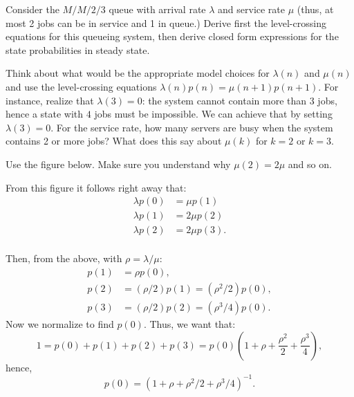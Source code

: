 \begin{exercise}[\faFlask]
Consider the $M/M/2/3$ queue with arrival rate $\lambda$ and
service rate $\mu$ (thus, at most 2 jobs can be in service and 1 in queue.)
 Derive first the level-crossing equations for this queueing system, then  derive closed form expressions for the state    probabilities in steady state. 
  \begin{hint}
 Think about what would be the appropriate model choices for
   $\lambda(n)$ and $\mu(n)$ and use the level-crossing equations
   $\lambda(n) p(n) = \mu(n+1)p(n+1)$.  For instance, realize that
   $\lambda(3)=0$: the system cannot contain more than 3 jobs, hence a
   state with $4$ jobs must be impossible. We can achieve that by
   setting $\lambda(3)=0$. For the service rate, how many servers are
   busy when the system contains 2 or more jobs?  What does this say
   about $\mu(k)$ for $k=2$ or $k=3$.
  \end{hint}
  \begin{solution}
 Use the figure below. Make sure you understand why $\mu(2)=2\mu$ and so on. 
    \begin{center}
      
    \end{center}

From this figure it follows right away that:
    \begin{align*}
   \lambda p(0) &= \mu p(1) \\
   \lambda p(1)  &= 2\mu p(2) \\
   \lambda p(2)  &= 2\mu p(3).\\
    \end{align*}

Then,  from the above, with $\rho=\lambda/\mu$: 
    \begin{align*}
      p(1) &= \rho p(0), \\
      p(2) &= (\rho/2) p(1) = (\rho^2/2) p(0), \\
      p(3) &= (\rho/2) p(2) = (\rho^3/4) p(0).
    \end{align*}
Now we normalize to find $p(0)$. Thus, we want that:
\begin{equation*}
  1 = p(0)+p(1)+p(2)+p(3) = p(0)\left(1 + \rho + \frac{\rho^2}2 + \frac{\rho^3}4\right),
\end{equation*}
hence,
\begin{equation*}
p(0) = (1+\rho + \rho^2/2 + \rho^3/4)^{-1}.
\end{equation*}
   \end{solution}
\end{exercise}


